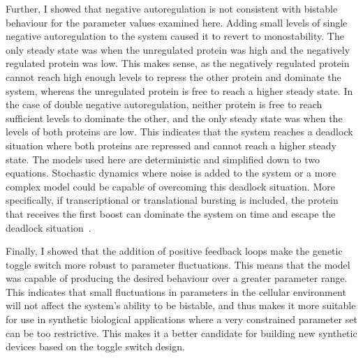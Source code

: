 Further, I showed that negative autoregulation is not consistent with bistable behaviour for the parameter values examined here. Adding small levels of single negative autoregulation to the system caused it to revert to monostability. The only steady state was when the unregulated protein was high and the negatively regulated protein was low. This makes sense, as the negatively regulated protein cannot reach high enough levels to repress the other protein and dominate the system, whereas the unregulated protein is free to reach a higher steady state. In the case of double negative autoregulation, neither protein is free to reach sufficient levels to dominate the other, and the only steady state was when the levels of both proteins are low. This indicates that the system reaches a deadlock situation where both proteins are repressed and cannot reach a higher steady state. The models used here are deterministic and simplified down to two equations. Stochastic dynamics where noise is added to the system or a more complex model could be capable of overcoming this deadlock situation. More specifically, if transcriptional or translational bursting is included, the protein that receives the first boost can dominate the system on time and escape the deadlock situation~\autocite{Strasser:2012kt}.


Finally, I showed that the addition of positive feedback loops make the genetic toggle switch more robust to parameter fluctuations. This means that the model was capable of producing the desired behaviour over a greater parameter range. This indicates that small fluctuations in parameters in the cellular environment will not affect the system's ability to be bistable, and thus makes it more suitable for use in synthetic biological applications where a very constrained parameter set can be too restrictive. This makes it a better candidate for building new synthetic devices based on the toggle switch design.
 



